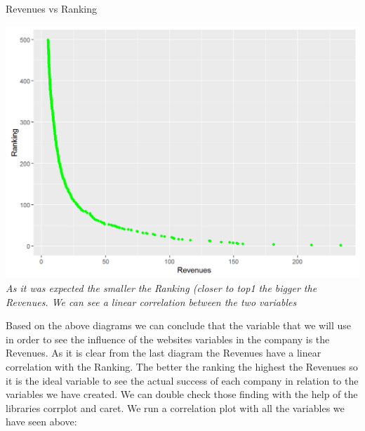 \documentclass{book}
\begin{document}
\begin{table}[H]
\centering
\caption{Revenues vs Ranking}
\begin{center}
\includegraphics[scale=0.3]{../R/photos/08_rank_rev.png}  \\
\textit{As it was expected the smaller the Ranking (closer to top1 the bigger the Revenues. We can see a linear correlation between the two variables}
\end{center}
\end{table}

Based on the above diagrams we can conclude that the variable that we will use in order to see the influence of the websites variables in the company is the Revenues. As it is clear from the last diagram the Revenues have a linear correlation with the Ranking. The better the ranking the highest the Revenues so it is the ideal variable to see the actual success of each company in relation to the variables we have created. We can double check those finding with the help of the libraries corrplot and caret. We run a correlation plot with all the variables we have seen above:
\end{document}
